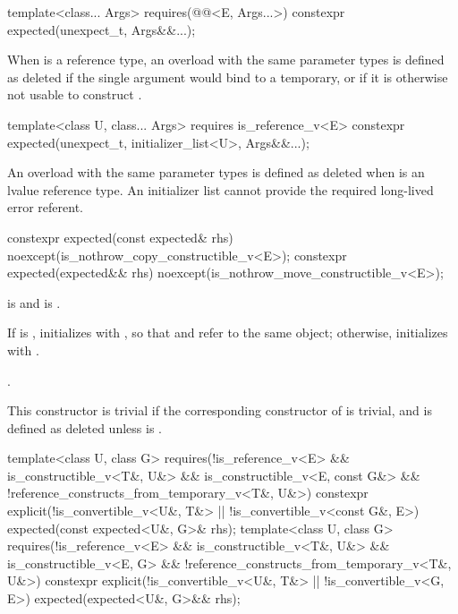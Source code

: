 %
\begin{itemdecl}
template<class... Args>
  requires(@@<E, Args...>)
constexpr expected(unexpect_t, Args&&...);
\end{itemdecl}

\begin{itemdescr}
\pnum
\remarks
When  is a reference type, an overload with the same parameter types is defined as deleted if the single argument would bind  to a temporary, or if it is otherwise not usable to construct .
\end{itemdescr}

%
\begin{itemdecl}
template<class U, class... Args>
  requires is_reference_v<E>
constexpr expected(unexpect_t, initializer_list<U>, Args&&...);
\end{itemdecl}

\begin{itemdescr}
\pnum
\remarks
An overload with the same parameter types is defined as deleted when  is an lvalue reference type. An initializer list cannot provide the required long-lived error referent.
\end{itemdescr}

%
\begin{itemdecl}
constexpr expected(const expected& rhs) noexcept(is_nothrow_copy_constructible_v<E>);
constexpr expected(expected&& rhs) noexcept(is_nothrow_move_constructible_v<E>);
\end{itemdecl}

\begin{itemdescr}
\pnum
\constraints
{} is  and  is .

\pnum
\effects
If  is , initializes  with , so that  and  refer to the same object; otherwise, initializes  with .

\pnum
\ensures
{}.

\pnum
\remarks
This constructor is trivial if the corresponding constructor of  is trivial, and is defined as deleted unless  is .
\end{itemdescr}

%
\begin{itemdecl}
template<class U, class G>
  requires(!is_reference_v<E> && is_constructible_v<T&, U&> &&
           is_constructible_v<E, const G&> &&
           !reference_constructs_from_temporary_v<T&, U&>)
constexpr explicit(!is_convertible_v<U&, T&> || !is_convertible_v<const G&, E>)
    expected(const expected<U&, G>& rhs);
template<class U, class G>
  requires(!is_reference_v<E> && is_constructible_v<T&, U&> &&
           is_constructible_v<E, G> && !reference_constructs_from_temporary_v<T&, U&>)
constexpr explicit(!is_convertible_v<U&, T&> || !is_convertible_v<G, E>)
    expected(expected<U&, G>&& rhs);
\end{itemdecl}

